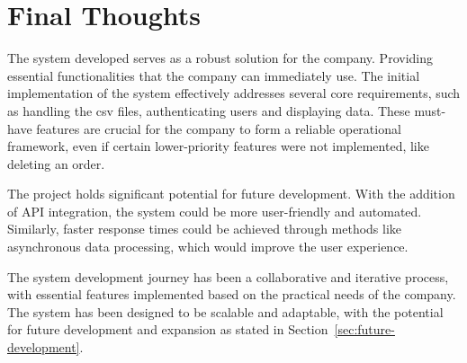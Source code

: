 \section{Final Thoughts}\label{sec:final-thoughts}

The system developed serves as a robust solution for the company.
Providing essential functionalities that the company can immediately use.
The initial implementation of the system effectively addresses several core requirements, such as handling the
csv files, authenticating users and displaying data.
These must-have features are crucial for the company to form a reliable operational framework, even if certain
lower-priority features were not implemented, like deleting an order.

The project holds significant potential for future development.
With the addition of API integration, the system could be more user-friendly and automated.
Similarly, faster response times could be achieved through methods like asynchronous data processing, which would
improve the user experience.

The system development journey has been a collaborative and iterative process, with essential features implemented
based on the practical needs of the company.
The system has been designed to be scalable and adaptable, with the potential for future development and expansion as
stated in Section~\ref{sec:future-development}.
